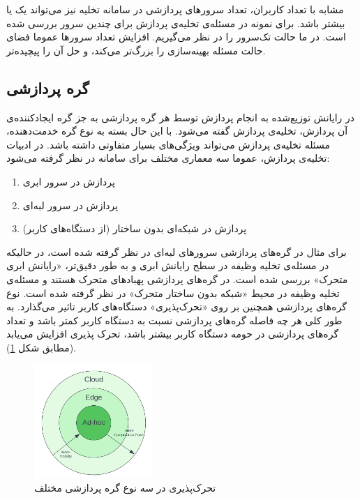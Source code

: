 مشابه با تعداد کاربران، تعداد سرورهای پردازشی در سامانه تخلیه نیز می‌تواند یک یا بیشتر باشد. برای نمونه در \cite{multiuser} مسئله‌ی تخلیه‌ی پردازش برای چندین سرور بررسی شده است. در \CurrentProject ما حالت تک‌سرور را در نظر می‌گیریم. افزایش تعداد سرورها عموما فضای حالت مسئله بهینه‌سازی را بزرگ‌تر می‌کند، و حل آن را پیچیده‌تر.

\subsection{گره پردازشی}
در رایانش توزیع‌شده به انجام پردازش توسط هر گره پردازشی به جز گره ایجادکننده‌ی آن پردازش، تخلیه‌ی پردازش گفته می‌شود. با این حال بسته به نوع گره خدمت‌دهنده، مسئله تخلیه‌ی پردازش می‌تواند ویژگی‌های بسیار متفاوتی داشته باشد. در ادبیات تخلیه‌ی پردازش، عموما سه معماری مختلف برای سامانه در نظر گرفته می‌شود:
\begin{enumerate}
	\item پردازش در سرور ابری
	\item پردازش در سرور لبه‌ای
	\item پردازش در شبکه‌ای بدون ساختار (از دستگاه‌های کاربر)
\end{enumerate}
برای مثال در \cite{Liu} گره‌های پردازشی سرورهای لبه‌ای در نظر گرفته شده است، در حالیکه در \cite{kwak} مسئله‌ی تخلیه وظیفه در سطح رایانش ابری و به طور دقیق‌تر، «رایانش ابری متحرک» بررسی شده است. در \cite{manet} گره‌های پردازشی پهبادهای متحرک هستند و مسئله‌ی تخلیه وظیفه در محیط «شبکه بدون ساختار متحرک» در نظر گرفته شده است. نوع گره‌های پردازشی همچنین بر روی «تحرک‌پذیری» دستگاه‌های کاربر تاثیر می‌گذارد. به طور کلی هر چه فاصله گره‌های پردازشی نسبت به دستگاه کاربر کمتر باشد و تعداد گره‌های پردازشی در حومه دستگاه کاربر بیشتر باشد، تحرک پذیری افزایش می‌یابد (مطابق شکل \ref{fig:mobility}).
\begin{figure}[H]
	\centering
	\includegraphics[width=0.4\textwidth]{figures/mobility.png}
	\caption{تحرک‌پذیری در سه نوع گره پردازشی مختلف}
	\label{fig:mobility}
\end{figure}

